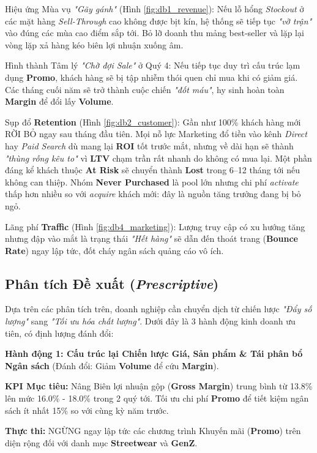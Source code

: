 \documentclass{article}
\begin{document}
Hiệu ứng Mùa vụ \textit{"Gãy gánh"} (Hình \ref{fig:db1_revenue}): Nếu lỗ hổng \textit{Stockout} ở các mặt hàng \textit{Sell-Through} cao không được bịt kín, hệ thống sẽ tiếp tục \textit{"vỡ trận"} vào đúng các mùa cao điểm sắp tới. Bỏ lỡ doanh thu mảng best-seller và lặp lại vòng lặp xả hàng kéo biên lợi nhuận xuống âm.

Hình thành Tâm lý \textit{"Chờ đợi Sale"} ở Quý 4: Nếu tiếp tục duy trì cấu trúc lạm dụng \textbf{Promo}, khách hàng sẽ bị tập nhiễm thói quen chỉ mua khi có giảm giá. Các tháng cuối năm sẽ trở thành cuộc chiến \textit{"đốt máu"}, hy sinh hoàn toàn \textbf{Margin} để đổi lấy \textbf{Volume}.

Sụp đổ \textbf{Retention} (Hình \ref{fig:db2_customer}): Gần như 100\% khách hàng mới RỜI BỎ ngay sau tháng đầu tiên. Mọi nỗ lực Marketing đổ tiền vào kênh \textit{Direct} hay \textit{Paid Search} dù mang lại \textbf{ROI} tốt trước mắt, nhưng về dài hạn sẽ thành \textit{"thùng rỗng kêu to"} vì \textbf{LTV} chạm trần rất nhanh do không có mua lại. Một phần đáng kể khách thuộc \textbf{At Risk} sẽ chuyển thành \textbf{Lost} trong 6–12 tháng tới nếu không can thiệp. Nhóm \textbf{Never Purchased} là pool lớn nhưng chi phí \textit{activate} thấp hơn nhiều so với \textit{acquire} khách mới: đây là nguồn tăng trưởng đang bị bỏ ngỏ.

Lãng phí \textbf{Traffic} (Hình \ref{fig:db4_marketing}): Lượng truy cập có xu hướng tăng nhưng đập vào mắt là trạng thái \textit{"Hết hàng"} sẽ dẫn đến thoát trang (\textbf{Bounce Rate}) ngay lập tức, đốt cháy ngân sách quảng cáo vô ích.

\subsection{Phân tích Đề xuất (\textit{Prescriptive})}

Dựa trên các phân tích trên, doanh nghiệp cần chuyển dịch từ chiến lược \textit{"Đẩy số lượng"} sang \textit{"Tối ưu hóa chất lượng"}. Dưới đây là 3 hành động kinh doanh ưu tiên, có định lượng đánh đổi:

\textbf{Hành động 1: Cấu trúc lại Chiến lược Giá, Sản phẩm \& Tái phân bổ Ngân sách} (Đánh đổi: Giảm \textbf{Volume} để cứu \textbf{Margin}).

\textbf{KPI Mục tiêu:} Nâng Biên lợi nhuận gộp (\textbf{Gross Margin}) trung bình từ 13.8\% lên mức 16.0\% - 18.0\% trong 2 quý tới. Tối ưu chi phí \textbf{Promo} để tiết kiệm ngân sách ít nhất 15\% so với cùng kỳ năm trước.

\textbf{Thực thi:} NGỪNG ngay lập tức các chương trình Khuyến mãi (\textbf{Promo}) trên diện rộng đối với danh mục \textbf{Streetwear} và \textbf{GenZ}.
\end{document}
